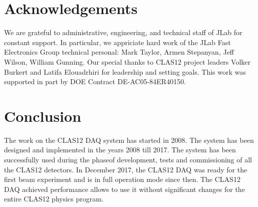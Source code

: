 \section{Acknowledgements}

We are grateful to administrative, engineering, and technical staff of JLab for constant support. In particular, we appriciate hard work of the JLab Fast Electronics Group technical personal: Mark Taylor, Armen Stepanyan, Jeff Wilson, William Gunning. Our special thanks to CLAS12 project leaders Volker Burkert and Latifa Elouadrhiri for leadership and setting goals. This work was supported in part by DOE Contract DE-AC05-84ER40150.

\section{Conclusion}

The work on the CLAS12 DAQ system has started in 2008. The system has been designed and implemented in the years 2008 till 2017. The system has been successfully used during the phaseof development, tests and commissioning of all the CLAS12 detectors. In December 2017, the CLAS12 DAQ was ready for the first beam experiment and is in full operation mode since then. The CLAS12 DAQ achieved performance allows to use it without significant changes for the entire CLAS12 physics program.
